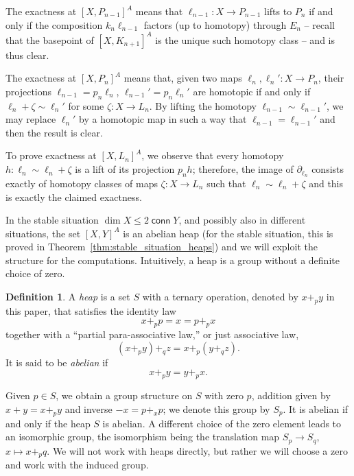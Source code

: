 \documentclass[12pt,a4wide]{article}
\theoremstyle{plain}
\theoremstyle{definition}
\newtheorem*{sdefinition}{Definition}
\newcommand{\conn}{\mathop{\mathsf{conn}}}
\newcommand{\heading}[1]{\vspace{1ex}\par\noindent{\bf\boldmath #1}}
\newcommand{\ellnmo}{\ell_{n-1}}
\newcommand{\elln}{\ell_n}
\newcommand{\thedim}{{n}}
\newcommand{\Pnew}{{P_\thedim}}
\newcommand{\Pold}{{P_{\thedim-1}}}
\newcommand{\Kn}{{K_{\thedim+1}}}
\newcommand{\En}{{E_\thedim}}
\newcommand{\Ln}{{L_\thedim}}
\newcommand{\kn}{{k_\thedim}}
\newcommand{\pn}{{p_\thedim}}
\renewcommand\:{\colon}
\begin{document}
\heading{Proof of exactness}

The exactness at $[X, \Pold]^A$ means that $\ellnmo \colon X \to \Pold$ lifts to $\Pnew$ if and only if the composition $\kn \ellnmo$ factors (up to homotopy) through $\En$ -- recall that the basepoint of $[X, \Kn]^A$ is the unique such homotopy class -- and is thus clear.

The exactness at $[X, \Pnew]^A$ means that, given two maps $\elln, \elln' \colon X \to \Pnew$, their projections $\ellnmo = \pn \elln$, $\ellnmo' = \pn \elln'$ are homotopic if and only if $\elln + \zeta \sim \elln'$ for some $\zeta \colon X \to \Ln$. By lifting the homotopy $\ellnmo \sim \ellnmo'$, we may replace $\elln'$ by a homotopic map in such a way that $\ellnmo = \ellnmo'$ and then the result is clear.

To prove exactness at $[X, \Ln]^A$, we observe that every homotopy $h \colon \elln \sim \elln + \zeta$ is a lift of its projection $\pn h$; therefore, the image of $\partial_{\elln}$ consists exactly of homotopy classes of maps $\zeta \colon X \to \Ln$ such that $\elln \sim \elln + \zeta$ and this is exactly the claimed exactness.

\heading{Heaps} \label{sec:heaps}

In the stable situation $\dim X \leq 2 \conn Y$, and possibly also in different situations, the set $[X, Y]^A$ is an abelian heap (for the stable situation, this is proved in Theorem~\ref{thm:stable_situation_heaps}) and we will exploit the structure for the computations. Intuitively, a heap is a group without a definite choice of zero.

\begin{sdefinition}
A \emph{heap} is a set $S$ with a ternary operation, denoted by $x +_p y$ in this paper, that satisfies the identity law
\[x +_p p = x = p +_p x\]
together with a ``partial para-associative law,'' or just associative law,
\[(x +_p y) +_q z = x +_p (y +_q z).\]
It is said to be \emph{abelian} if
\[x +_p y = y +_p x.\]
\end{sdefinition}

Given $p \in S$, we obtain a group structure on $S$ with zero $p$, addition given by $x + y = x +_p y$ and inverse $-x = p +_x p$; we denote this group by $S_p$. It is abelian if and only if the heap $S$ is abelian. A different choice of the zero element leads to an isomorphic group, the isomorphism being the translation map $S_p \to S_q$, $x \mapsto x +_p q$. We will not work with heaps directly, but rather we will choose a zero and work with the induced group.
\end{document}
